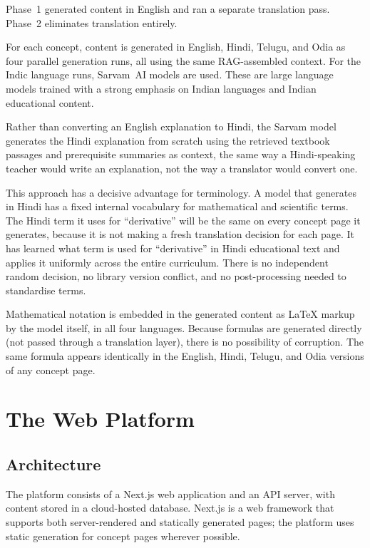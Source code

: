 \documentclass[12pt,a4paper]{article}
\begin{document}
Phase~1 generated content in English and ran a separate translation pass.
Phase~2 eliminates translation entirely.

For each concept, content is generated in English, Hindi, Telugu, and Odia as four
parallel generation runs, all using the same RAG-assembled context.
For the Indic language runs, Sarvam~AI models are used.
These are large language models trained with a strong emphasis on Indian languages
and Indian educational content.

Rather than converting an English explanation to Hindi,
the Sarvam model generates the Hindi explanation from scratch using the retrieved
textbook passages and prerequisite summaries as context,
the same way a Hindi-speaking teacher would write an explanation,
not the way a translator would convert one.

This approach has a decisive advantage for terminology.
A model that generates in Hindi has a fixed internal vocabulary for mathematical
and scientific terms.
The Hindi term it uses for ``derivative'' will be the same on every concept page
it generates, because it is not making a fresh translation decision for each page.
It has learned what term is used for ``derivative'' in Hindi educational text
and applies it uniformly across the entire curriculum.
There is no independent random decision, no library version conflict,
and no post-processing needed to standardise terms.

Mathematical notation is embedded in the generated content as \LaTeX{} markup
by the model itself, in all four languages.
Because formulas are generated directly (not passed through a translation layer),
there is no possibility of corruption.
The same formula appears identically in the English, Hindi, Telugu, and Odia versions
of any concept page.

\section{The Web Platform}

\subsection{Architecture}

The platform consists of a Next.js web application and an API server,
with content stored in a cloud-hosted database.
Next.js is a web framework that supports both server-rendered and statically generated pages;
the platform uses static generation for concept pages wherever possible.
\end{document}
